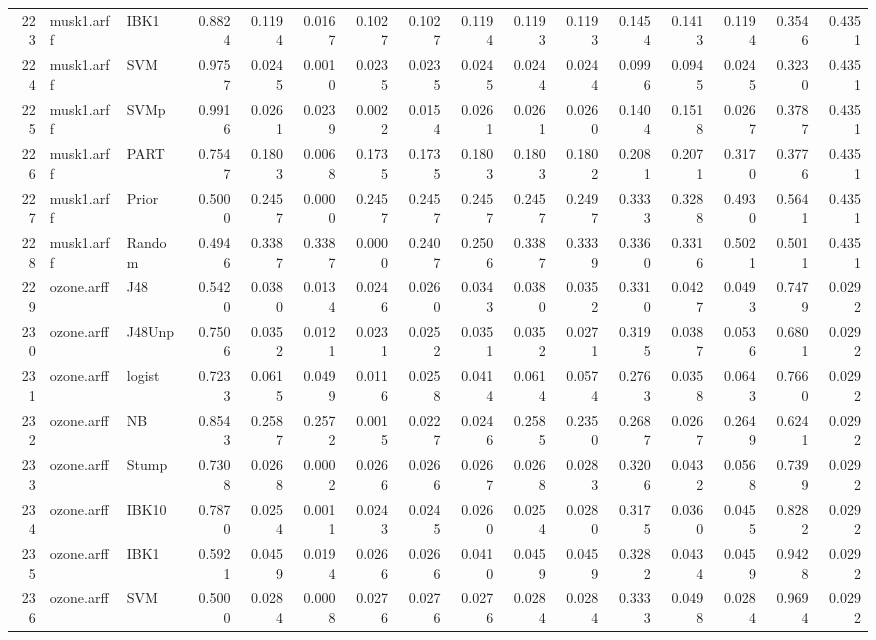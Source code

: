 \documentclass {article}
\begin{document}
\begin{table}[ht]
\begin{tabular}{rllrrrrrrrrrrrrr}
  223 & musk1.arff & IBK1 & 0.8824 & 0.1194 & 0.0167 & 0.1027 & 0.1027 & 0.1194 & 0.1193 & 0.1193 & 0.1454 & 0.1413 & 0.1194 & 0.3546 & 0.4351 \\ 
  224 & musk1.arff & SVM & 0.9757 & 0.0245 & 0.0010 & 0.0235 & 0.0235 & 0.0245 & 0.0244 & 0.0244 & 0.0996 & 0.0945 & 0.0245 & 0.3230 & 0.4351 \\ 
  225 & musk1.arff & SVMp & 0.9916 & 0.0261 & 0.0239 & 0.0022 & 0.0154 & 0.0261 & 0.0261 & 0.0260 & 0.1404 & 0.1518 & 0.0267 & 0.3787 & 0.4351 \\ 
  226 & musk1.arff & PART & 0.7547 & 0.1803 & 0.0068 & 0.1735 & 0.1735 & 0.1803 & 0.1803 & 0.1802 & 0.2081 & 0.2071 & 0.3170 & 0.3776 & 0.4351 \\ 
  227 & musk1.arff & Prior & 0.5000 & 0.2457 & 0.0000 & 0.2457 & 0.2457 & 0.2457 & 0.2457 & 0.2497 & 0.3333 & 0.3288 & 0.4930 & 0.5641 & 0.4351 \\ 
  228 & musk1.arff & Random & 0.4946 & 0.3387 & 0.3387 & 0.0000 & 0.2407 & 0.2506 & 0.3387 & 0.3339 & 0.3360 & 0.3316 & 0.5021 & 0.5011 & 0.4351 \\ 
  229 & ozone.arff & J48 & 0.5420 & 0.0380 & 0.0134 & 0.0246 & 0.0260 & 0.0343 & 0.0380 & 0.0352 & 0.3310 & 0.0427 & 0.0493 & 0.7479 & 0.0292 \\ 
  230 & ozone.arff & J48Unp & 0.7506 & 0.0352 & 0.0121 & 0.0231 & 0.0252 & 0.0351 & 0.0352 & 0.0271 & 0.3195 & 0.0387 & 0.0536 & 0.6801 & 0.0292 \\ 
  231 & ozone.arff & logist & 0.7233 & 0.0615 & 0.0499 & 0.0116 & 0.0258 & 0.0414 & 0.0614 & 0.0574 & 0.2763 & 0.0358 & 0.0643 & 0.7660 & 0.0292 \\ 
  232 & ozone.arff & NB & 0.8543 & 0.2587 & 0.2572 & 0.0015 & 0.0227 & 0.0246 & 0.2585 & 0.2350 & 0.2687 & 0.0267 & 0.2649 & 0.6241 & 0.0292 \\ 
  233 & ozone.arff & Stump & 0.7308 & 0.0268 & 0.0002 & 0.0266 & 0.0266 & 0.0267 & 0.0268 & 0.0283 & 0.3206 & 0.0432 & 0.0568 & 0.7399 & 0.0292 \\ 
  234 & ozone.arff & IBK10 & 0.7870 & 0.0254 & 0.0011 & 0.0243 & 0.0245 & 0.0260 & 0.0254 & 0.0280 & 0.3175 & 0.0360 & 0.0455 & 0.8282 & 0.0292 \\ 
  235 & ozone.arff & IBK1 & 0.5921 & 0.0459 & 0.0194 & 0.0266 & 0.0266 & 0.0410 & 0.0459 & 0.0459 & 0.3282 & 0.0434 & 0.0459 & 0.9428 & 0.0292 \\ 
  236 & ozone.arff & SVM & 0.5000 & 0.0284 & 0.0008 & 0.0276 & 0.0276 & 0.0276 & 0.0284 & 0.0284 & 0.3333 & 0.0498 & 0.0284 & 0.9694 & 0.0292 \\ 

\end{tabular}
\end{table}
\end{document}

